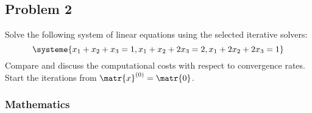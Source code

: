 \subsection{Problem 2}%
\label{sec:problem_2}
Solve the following system of linear equations using the selected iterative solvers:
\begin{equation*}
  \systeme{x_1+x_2+x_3=1,x_1+x_2+2x_3=2,x_1+2x_2+2x_3=1}
\end{equation*}
Compare and discuss the computational costs with respect to convergence rates.
Start the iterations from $\matr{x}^{(0)}=\matr{0}$.
\subsubsection*{Mathematics}
